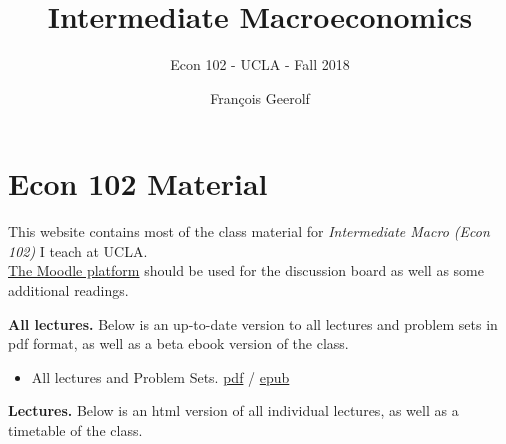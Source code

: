 \documentclass[]{book}
\title{Intermediate Macroeconomics}
\subtitle{Econ 102 - UCLA - Fall 2018}
\author{François Geerolf}
\date{}
\providecommand{\tightlist}{%
  \setlength{\itemsep}{0pt}\setlength{\parskip}{0pt}}
\theoremstyle{definition}
\theoremstyle{definition}
\theoremstyle{definition}
\theoremstyle{remark}
\begin{document}
\maketitle

{
\setcounter{tocdepth}{2}
\tableofcontents
}
\listoftables
\listoffigures
\chapter*{Econ 102 Material}\label{econ-102-material}

This website contains most of the class material for \emph{Intermediate
Macro (Econ 102)} I teach at UCLA.\\
\href{https://moodle2.sscnet.ucla.edu/course/view/18F-ECON102-1}{The
Moodle platform} should be used for the discussion board as well as some
additional readings.

\textbf{All lectures.} Below is an up-to-date version to all lectures
and problem sets in pdf format, as well as a beta ebook version of the
class.

\begin{itemize}
\tightlist
\item
  All lectures and Problem Sets.
  \href{econ102-ucla-2018F-geerolf.pdf}{pdf} /
  \href{econ102-ucla-2018F-geerolf.epub}{epub}
\end{itemize}

\textbf{Lectures.} Below is an html version of all individual lectures,
as well as a timetable of the class.
\end{document}
